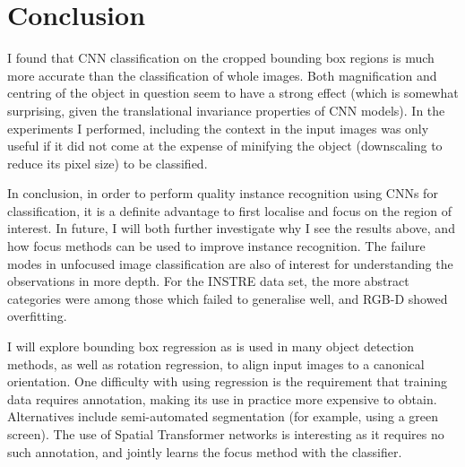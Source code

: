 \section{Conclusion}

I found that CNN classification on the cropped bounding box regions is much more accurate than the classification of whole images. Both magnification and centring of the object in question seem to have a strong effect (which is somewhat surprising, given the translational invariance properties of CNN models). In the experiments I performed, including the context in the input images was only useful if it did not come at the expense of minifying the object (downscaling to reduce its pixel size) to be classified.

In conclusion, in order to perform quality instance recognition using \gls{CNN}s for classification, it is a definite advantage to first localise and focus on the region of interest.  In future, I will both further investigate why I see the results above, and how focus methods can be used to improve instance recognition. The failure modes in unfocused image classification are also of interest for understanding the observations in more depth. For the INSTRE data set, the more abstract categories were among those which failed to generalise well, and RGB-D showed overfitting.

I will explore bounding box regression as is used in many object detection methods, as well as rotation regression, to align input images to a canonical orientation. One difficulty with using regression is the requirement that training data requires annotation, making its use in practice more expensive to obtain. Alternatives include semi-automated segmentation (for example, using a green screen). The use of Spatial Transformer networks is interesting as it requires no such annotation, and jointly learns the focus method with the classifier.




